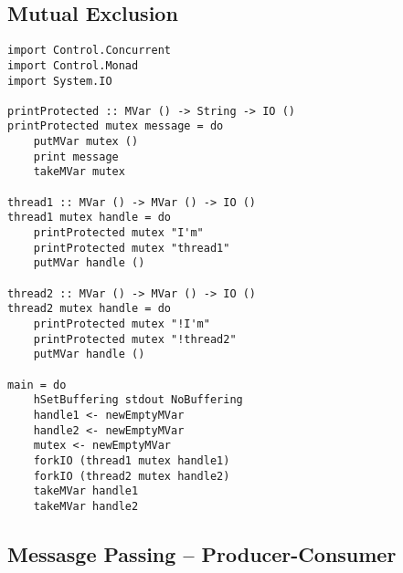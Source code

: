 \documentclass[twocolumn,landscape,10pt]{article}
\theoremstyle{definition}
\begin{document}
\subsection{Mutual Exclusion}

\begin{lstlisting}[Haskell]
import Control.Concurrent
import Control.Monad
import System.IO

printProtected :: MVar () -> String -> IO ()
printProtected mutex message = do
    putMVar mutex ()
    print message
    takeMVar mutex

thread1 :: MVar () -> MVar () -> IO ()
thread1 mutex handle = do
    printProtected mutex "I'm"
    printProtected mutex "thread1"
    putMVar handle ()

thread2 :: MVar () -> MVar () -> IO ()
thread2 mutex handle = do
    printProtected mutex "!I'm"
    printProtected mutex "!thread2"
    putMVar handle ()

main = do
    hSetBuffering stdout NoBuffering
    handle1 <- newEmptyMVar
    handle2 <- newEmptyMVar
    mutex <- newEmptyMVar
    forkIO (thread1 mutex handle1)
    forkIO (thread2 mutex handle2)
    takeMVar handle1
    takeMVar handle2
\end{lstlisting} 

\subsection{Messasge Passing -- Producer-Consumer}
\end{document}
